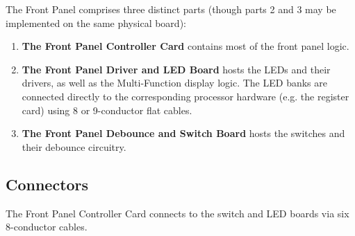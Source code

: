 The Front Panel comprises three distinct parts (though parts 2 and 3
may be implemented on the same physical board):

\begin{enumerate}
\item{\bfseries The Front Panel Controller Card} contains most of the front
  panel logic.
\item{\bfseries The Front Panel Driver and LED Board} hosts the LEDs and
  their drivers, as well as the Multi-Function display logic. The LED
  banks are connected directly to the corresponding processor hardware
  (e.g. the register card) using 8 or 9-conductor flat cables.
\item{\bfseries The Front Panel Debounce and Switch Board} hosts the switches
  and their debounce circuitry.
\end{enumerate}

\subsection{Connectors}

The Front Panel Controller Card connects to the switch and LED boards
via six 8-conductor cables.

